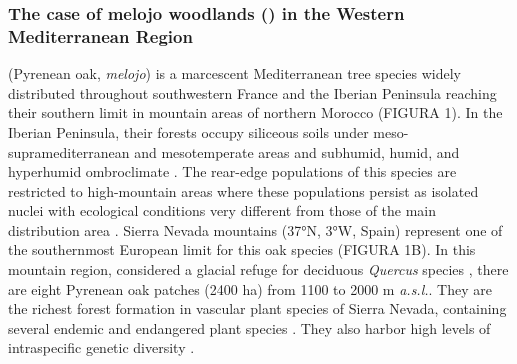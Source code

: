 \subsubsection{The case of melojo woodlands (\Qpy) in the Western Mediterranean Region}\label{sec:es:intro-qp}
\Qpw (Pyrenean oak, \emph{melojo}) is a marcescent Mediterranean tree species widely distributed throughout southwestern France and the Iberian Peninsula reaching their southern limit in mountain areas of northern Morocco \autocites{Franco1990Quercus} (FIGURA 1). In the Iberian Peninsula, their forests occupy siliceous soils under meso-supramediterranean and mesotemperate areas and subhumid, humid, and hyperhumid ombroclimate \autocites{delaSernaetal2016MarcescentQuercus,Gavilanetal2018SclerophyllousDeciduous}. The rear-edge populations of this species are restricted to high-mountain areas where these populations persist as isolated nuclei with ecological conditions very different from those of the main distribution area \autocites{PerezLuqueetal2021EcologicalDiversity}. Sierra Nevada  mountains (37°N, 3°W, Spain) represent one of the southernmost European limit for this oak species (FIGURA 1B). In this mountain region, considered a glacial refuge for deciduous \emph{Quercus} species \autocite{Olaldeetal2002WhiteOaks}, there are eight Pyrenean oak patches (2400 ha) from 1100 to 2000 m \emph{a.s.l.}. They are the richest forest formation in vascular plant species of Sierra Nevada, containing several endemic and endangered plant species \autocite{Loriteetal2008PhytosociologicalReview}. They also harbor high levels of intraspecific genetic diversity \autocite{ValbuenaCarabanaGil2013GeneticResilience,ValbuenaCarabanaGil2017CentenaryCoppicing}. 

